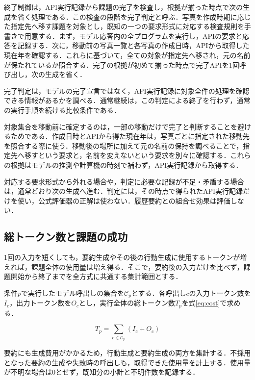 \documentclass[letter]{ieicej}
\begin{document}
終了制御は，API実行記録から課題の完了を検査し，根拠が揃った時点で次の生成を省く処理である．この検査の段階を完了判定と呼ぶ．写真を作成時期に応じた指定先へ移す課題を対象とし，既知の一つの要求形式に対応する検査規則を手書きで用意する．まず，モデル応答内の全プログラムを実行し，APIの要求と応答を記録する．次に，移動前の写真一覧と各写真の作成日時，APIから取得した現在年を確認する．これらに基づいて，全ての対象が指定先へ移され，元の名前が保たれているか照合する．完了の根拠が初めて揃った時点で完了APIを1回呼び出し，次の生成を省く．

完了判定は，モデルの完了宣言ではなく，API実行記録に対象全件の処理を確認できる情報があるかを調べる．通常継続は，この判定による終了を行わず，通常の実行手順を続ける比較条件である．

対象集合を移動前に確定するのは，一部の移動だけで完了と判断することを避けるためである．作成日時とAPIから得た現在年は，写真ごとに指定された移動先を照合する際に使う．移動後の場所に加えて元の名前の保持を調べることで，指定先へ移すという要求と，名前を変えないという要求を別々に確認する．これらの根拠はモデルの推測や計算機の時刻で補わず，API実行記録から取得する．

対応する要求形式から外れる場合や，判定に必要な記録が不足・矛盾する場合は，通常どおり次の生成へ進む．判定には，その時点で得られたAPI実行記録だけを使い，公式評価器の正解は使わない．履歴要約との組合せ効果は評価しない．

\subsection{総トークン数と課題の成功}

1回の入力を短くしても，要約生成やその後の行動生成に使用するトークンが増えれば，課題全体の使用量は増え得る．そこで，要約後の入力だけを比べず，課題開始から終了までを全方式に共通する集計範囲とする．

\par\noindent\begin{minipage}{\columnwidth}
\setlength{\abovedisplayskip}{4pt}\setlength{\belowdisplayskip}{4pt}
条件$p$で実行したモデル呼出しの集合を$\mathcal C_p$とする．各呼出し$c$の入力トークン数を$I_c$，出力トークン数を$O_c$とし，実行全体の総トークン数$T_p$を\mbox{式\eqref{eq:cost}で求める．}

\begin{equation}
 T_p=\sum_{c\in\mathcal C_p}(I_c+O_c)
 \label{eq:cost}
\end{equation}

要約にも生成費用がかかるため，行動生成と要約生成の両方を集計する．不採用となった要約の生成や失敗時の呼出しも，取得できた使用量を計上する．使用量が不明な場合は0とせず，既知分の小計と不明件数を記録する．

\end{minipage}\par{}
\end{document}
